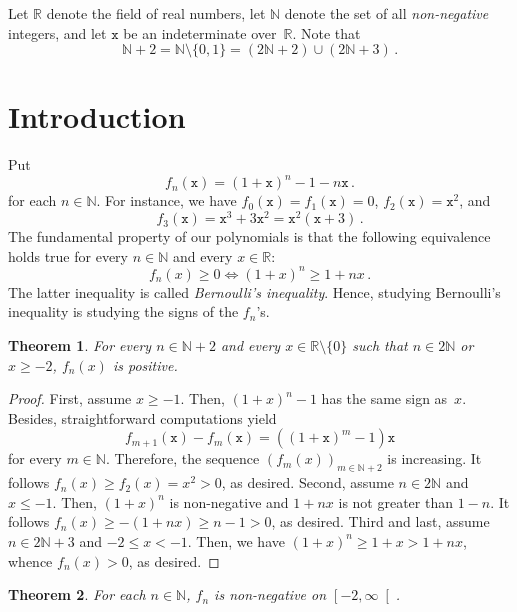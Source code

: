 \documentclass[12pt]{article}
\newcommand{\bR}{\mathbb{R}}
\newcommand{\bN}{\mathbb{N}}
\newcommand{\geint}[1]{\left[ #1, \infty \right[}
\newcommand{\ttx}{\mathtt{x}}
\newtheorem{theorem}{Theorem}
\begin{document}
\sloppy

Let $\bR$ denote the field of real numbers,
let $\bN$ denote the set of all \emph{non-negative} integers, and 
let $\ttx$ be an indeterminate over~$\bR$.
Note that
$$\bN + 2 = \bN \setminus \{ 0, 1 \} = (2 \bN + 2) \cup (2 \bN + 3) \, .$$
\section{Introduction}

Put
$$
f_n(\ttx) = {(1 + \ttx)}^n - 1 - n \ttx \,.
$$
for each $n \in \bN$.
For instance, we have 
$f_0(\ttx) = f_1(\ttx) = 0$,
$f_2(\ttx) = \ttx^2$, and
\begin{equation} \label{eq:f3-t3}
f_3(\ttx) = \ttx^3 + 3 \ttx^2 = \ttx^2 (\ttx + 3) \,.
\end{equation}
The fundamental property of our polynomials is
that the following equivalence holds true for every $n \in \bN$ and every $x \in \bR$:
$$
f_n(x) \ge 0 \iff {(1 + x)}^n \ge 1 + n x \,.
$$ 
The latter inequality is called \emph{Bernoulli's inequality}.
Hence, studying Bernoulli's inequality is studying the signs of the $f_n$'s.

 \begin{theorem}%
   \label{thm:Bernoulli}
   For every $n \in \bN + 2$ and every $x \in \bR \setminus \{ 0 \}$ such that $n \in 2 \bN$ or $x \ge - 2$,
   $f_n(x)$ is positive.
 \end{theorem}

 \begin{proof}
   First, assume $x \ge - 1$.
   Then, ${(1 + x)}^n - 1$ has the same sign as~$x$.
   Besides, straightforward computations yield
   $$
   f_{m + 1}(\ttx) - f_m(\ttx) =  \left( {(1 + \ttx)}^m - 1 \right) \ttx 
   $$
   for every $m \in \bN$.
   Therefore, the sequence $\left( f_m(x) \right)_{m \in \bN + 2}$ is increasing.
   It follows $f_n(x) \ge f_2(x) = x^2 > 0$, as desired.
   Second, assume $n \in 2 \bN$ and $x \le - 1$.
   Then, ${(1 + x)}^n$ is non-negative and $1 + n x$ is not greater than $1 - n$.
   It follows $f_n(x) \ge - (1 + n x) \ge n - 1 > 0$, as desired.
   Third and last, assume $n \in 2 \bN + 3$ and $- 2 \le x < - 1$.
   Then,
   we have ${(1 + x)}^n \ge 1  + x > 1 + n x$,
   whence $f_n(x) > 0$, as desired.
 \end{proof}

 \begin{theorem} \label{thm:Bernoulli-non-strict}
   For each $n \in \bN$, $f_n$ is non-negative on $\geint{- 2}$.
 \end{theorem}
\end{document}
